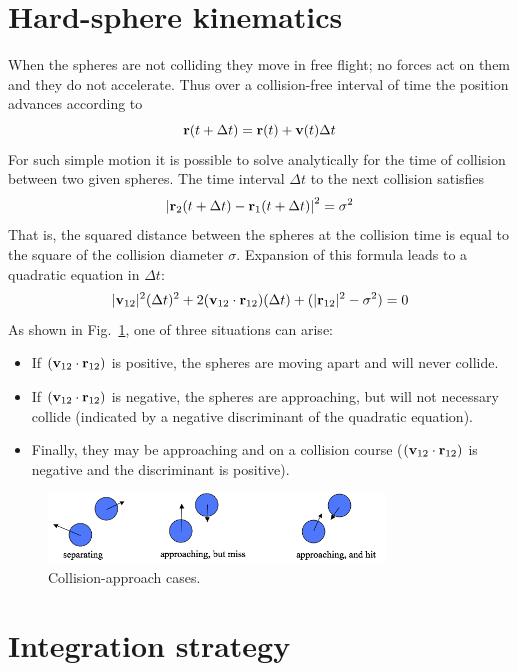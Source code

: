 \documentclass[9pt,bestpractices]{molsim}
\begin{document}
\section{Hard-sphere kinematics}\label{hard-sphere-kinematics}

When the spheres are not colliding they move in free flight; no forces
act on them and they do not accelerate. Thus over a collision-free
interval of time the position advances according to
\[{\bf{r}}(t + \Delta t) = {\bf{r}}(t) + {\bf{v}}(t)\Delta t\]
For such simple motion it is possible to solve analytically for the time
of collision between two given spheres. The time interval $\Delta t$ to the next
collision satisfies
\[{\left| {{{\bf{r}}_2}(t + \Delta t) - {{\bf{r}}_1}(t + \Delta t)} \right|^2} = {\sigma ^2}\]
That is, the squared distance between the spheres at the collision time
is equal to the square of the collision diameter $\sigma$.
Expansion of this formula leads to
a quadratic equation in $\Delta t$:
\[|{{\bf{v}}_{12}}{|^2}{(\Delta t)^2} + 2({{\bf{v}}_{12}} \cdot {{\bf{r}}_{12}})(\Delta t) + (|{{\bf{r}}_{12}}{|^2} - {\sigma ^2}) = 0\]
As shown in Fig.~\ref{fig:approaches}, one of three situations can arise:

\begin{itemize}
\item If $({\bf v}_{12}\cdot {\bf r}_{12})$ is positive, the spheres are moving apart and will never collide. 
\item If $({\bf v}_{12}\cdot {\bf r}_{12})$ is negative, the spheres are approaching, but will not necessary collide
(indicated by a negative discriminant of the quadratic equation).
\item Finally, they may be approaching and on a collision course ($({\bf v}_{12}\cdot {\bf r}_{12})$ is negative
and the discriminant is positive).
\end{itemize}

\begin{figure}
  \centering
  \includegraphics[width=0.8\textwidth]{HSMD_figures/image030}
  \caption{\label{fig:approaches}Collision-approach cases.}
\end{figure}


\section{Integration strategy}\label{integration-strategy}
\end{document}
